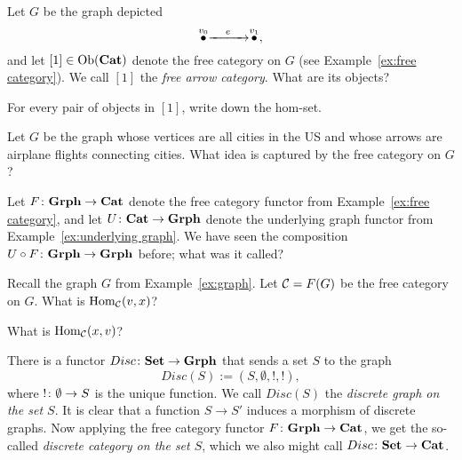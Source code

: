\documentclass[CT4S-EN-RU]{subfiles}
\begin{document}
\begin{exerciseENG}\label{exc:[1]}
Let $G$ be the graph depicted $$\stackrel{v_0}{\bullet}\xrightarrow{\ \ \;\;e\;\;\ \ }\stackrel{v_1}{\bullet},$$ and let $[1]\in\textnormal{Ob}({\mathbf{Cat}})$ denote the free category on $G$ (see Example~\ref{ex:free category}). We call $[1]$ the {\em free arrow category}.
\sexc What are its objects?
\item For every pair of objects in $[1]$, write down the hom-set.
\endsexc
\end{exerciseENG}

\begin{exerciseRUS}\label{exc:[1]}
\end{exerciseRUS}

\begin{exerciseENG}
Let $G$ be the graph whose vertices are all cities in the US and whose arrows are airplane flights connecting cities. What idea is captured by the free category on $G$?
\end{exerciseENG}

\begin{exerciseRUS}
\end{exerciseRUS}

\begin{exerciseENG}\label{exc:free underlying cat grph}
Let $F\colon{\mathbf{Grph}}\rightarrow{\mathbf{Cat}}$ denote the free category functor from Example~\ref{ex:free category}, and let $U\colon{\mathbf{Cat}}\rightarrow{\mathbf{Grph}}$ denote the underlying graph functor from Example~\ref{ex:underlying graph}. We have seen the composition $U\circ F\colon{\mathbf{Grph}}\rightarrow{\mathbf{Grph}}$ before; what was it called?
\end{exerciseENG}

\begin{exerciseRUS}\label{exc:free underlying cat grph}
\end{exerciseRUS}

\begin{exerciseENG}
Recall the graph $G$ from Example~\ref{ex:graph}. Let $\mathcal{C}=F(G)$ be the free category on $G$.
\sexc What is $\textnormal{Hom}_\mathcal{C}(v,x)$?
\item What is $\textnormal{Hom}_\mathcal{C}(x,v)$?
\endsexc
\end{exerciseENG}

\begin{exerciseRUS}
\end{exerciseRUS}

\begin{exampleENG}\label{ex:discrete graph discrete cat}
There is a functor $Disc\colon{\mathbf{Set}}\rightarrow{\mathbf{Grph}}$ that sends a set $S$ to the graph $$Disc(S):=(S,\emptyset,!,!),$$ where $!\colon\emptyset\rightarrow S$ is the unique function. We call $Disc(S)$ the {\em discrete graph on the set $S$}. It is clear that a function $S\to S'$ induces a morphism of discrete graphs. Now applying the free category functor $F\colon{\mathbf{Grph}}\rightarrow{\mathbf{Cat}}$, we get the so-called {\em discrete category on the set $S$}, which we also might call $Disc\colon{\mathbf{Set}}\rightarrow{\mathbf{Cat}}$. 
\end{exampleENG}
\end{document}

